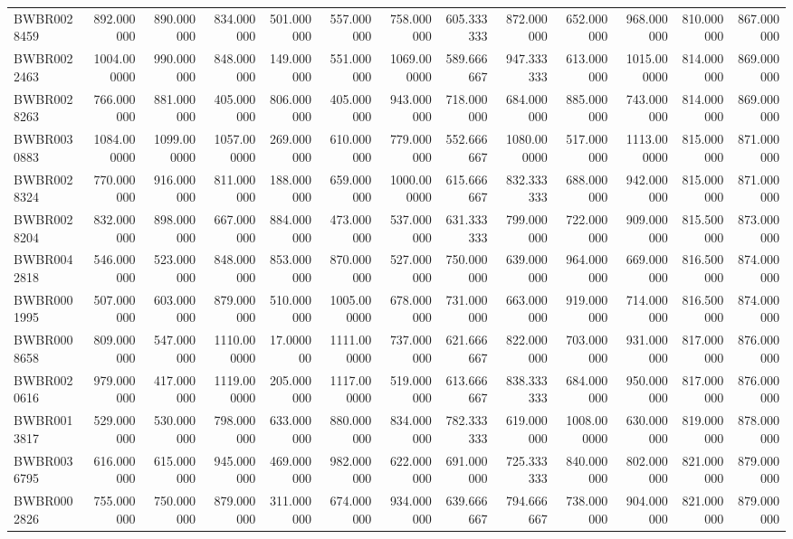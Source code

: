 \begin{longtable}{lrrrrrrrrrrrr}
BWBR0028459 & 892.000000 & 890.000000 & 834.000000 & 501.000000 & 557.000000 & 758.000000 & 605.333333 & 872.000000 & 652.000000 & 968.000000 & 810.000000 & 867.000000 \\
BWBR0022463 & 1004.000000 & 990.000000 & 848.000000 & 149.000000 & 551.000000 & 1069.000000 & 589.666667 & 947.333333 & 613.000000 & 1015.000000 & 814.000000 & 869.000000 \\
BWBR0028263 & 766.000000 & 881.000000 & 405.000000 & 806.000000 & 405.000000 & 943.000000 & 718.000000 & 684.000000 & 885.000000 & 743.000000 & 814.000000 & 869.000000 \\
BWBR0030883 & 1084.000000 & 1099.000000 & 1057.000000 & 269.000000 & 610.000000 & 779.000000 & 552.666667 & 1080.000000 & 517.000000 & 1113.000000 & 815.000000 & 871.000000 \\
BWBR0028324 & 770.000000 & 916.000000 & 811.000000 & 188.000000 & 659.000000 & 1000.000000 & 615.666667 & 832.333333 & 688.000000 & 942.000000 & 815.000000 & 871.000000 \\
BWBR0028204 & 832.000000 & 898.000000 & 667.000000 & 884.000000 & 473.000000 & 537.000000 & 631.333333 & 799.000000 & 722.000000 & 909.000000 & 815.500000 & 873.000000 \\
BWBR0042818 & 546.000000 & 523.000000 & 848.000000 & 853.000000 & 870.000000 & 527.000000 & 750.000000 & 639.000000 & 964.000000 & 669.000000 & 816.500000 & 874.000000 \\
BWBR0001995 & 507.000000 & 603.000000 & 879.000000 & 510.000000 & 1005.000000 & 678.000000 & 731.000000 & 663.000000 & 919.000000 & 714.000000 & 816.500000 & 874.000000 \\
BWBR0008658 & 809.000000 & 547.000000 & 1110.000000 & 17.000000 & 1111.000000 & 737.000000 & 621.666667 & 822.000000 & 703.000000 & 931.000000 & 817.000000 & 876.000000 \\
BWBR0020616 & 979.000000 & 417.000000 & 1119.000000 & 205.000000 & 1117.000000 & 519.000000 & 613.666667 & 838.333333 & 684.000000 & 950.000000 & 817.000000 & 876.000000 \\
BWBR0013817 & 529.000000 & 530.000000 & 798.000000 & 633.000000 & 880.000000 & 834.000000 & 782.333333 & 619.000000 & 1008.000000 & 630.000000 & 819.000000 & 878.000000 \\
BWBR0036795 & 616.000000 & 615.000000 & 945.000000 & 469.000000 & 982.000000 & 622.000000 & 691.000000 & 725.333333 & 840.000000 & 802.000000 & 821.000000 & 879.000000 \\
BWBR0002826 & 755.000000 & 750.000000 & 879.000000 & 311.000000 & 674.000000 & 934.000000 & 639.666667 & 794.666667 & 738.000000 & 904.000000 & 821.000000 & 879.000000 \\

\end{longtable}
